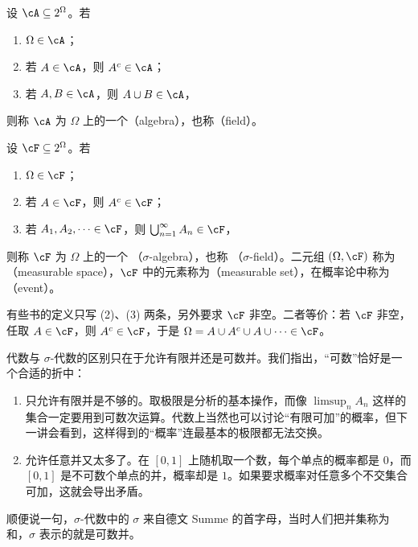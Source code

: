 
\begin{definition}[代数]\label{def:set-systems:algebra}
设 $\cA\subseteq2^\Omega$。若
\begin{enumerate}
\item $\Omega\in\cA$；
\item 若 $A\in\cA$，则 $A^c\in\cA$；
\item 若 $A,B\in\cA$，则 $A\cup B\in\cA$，
\end{enumerate}
则称 $\cA$ 为 $\Omega$ 上的一个（algebra），也称（field）。
\end{definition}

\begin{definition}[$\sigma$-代数]\label{def:set-systems:sigma-algebra}
设 $\cF\subseteq2^\Omega$。若
\begin{enumerate}
\item $\Omega\in\cF$；
\item 若 $A\in\cF$，则 $A^c\in\cF$；
\item 若 $A_1,A_2,\dots\in\cF$，则 $\bigcup_{n=1}^\infty A_n\in\cF$，
\end{enumerate}
则称 $\cF$ 为 $\Omega$ 上的一个 （$\sigma$-algebra），也称 （$\sigma$-field）。二元组 $(\Omega,\cF)$ 称为（measurable space），$\cF$ 中的元素称为（measurable set），在概率论中称为（event）。
\end{definition}

有些书的定义只写 (2)、(3) 两条，另外要求 $\cF$ 非空。二者等价：若 $\cF$ 非空，任取 $A\in\cF$，则 $A^c\in\cF$，于是 $\Omega=A\cup A^c\cup A\cup\cdots\in\cF$。

\begin{remark}[为什么是“可数”]
代数与 $\sigma$-代数的区别只在于允许有限并还是可数并。我们指出，“可数”恰好是一个合适的折中：
\begin{enumerate}
\item 只允许有限并是不够的。取极限是分析的基本操作，而像 $\limsup_nA_n$ 这样的集合一定要用到可数次运算。代数上当然也可以讨论“有限可加”的概率，但下一讲会看到，这样得到的“概率”连最基本的极限都无法交换。
\item 允许任意并又太多了。在 $[0,1]$ 上随机取一个数，每个单点的概率都是 $0$，而 $[0,1]$ 是不可数个单点的并，概率却是 $1$。如果要求概率对任意多个不交集合可加，这就会导出矛盾。
\end{enumerate}
顺便说一句，$\sigma$-代数中的 $\sigma$ 来自德文 Summe 的首字母，当时人们把并集称为和，$\sigma$ 表示的就是可数并。
\end{remark}

